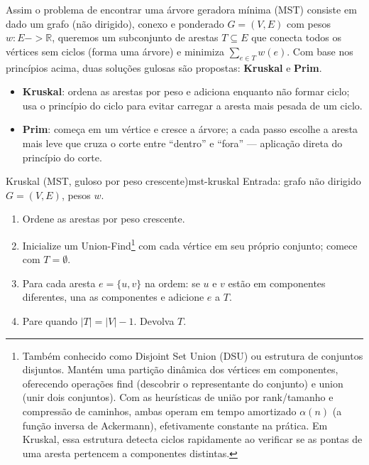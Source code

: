 \documentclass[12pt,a4paper]{article}
\def\texttt#1{#1}%
\def\emph#1{#1}%
\def\to{->}%
\begin{document}
Assim o problema de encontrar uma árvore geradora mínima (MST) consiste em dado um grafo (não dirigido), conexo e ponderado \(G=(V,E)\) com pesos \(w:E\to\mathbb{R}\), queremos um subconjunto de arestas \(T\subseteq E\) que conecta todos os vértices sem ciclos (forma uma árvore) e minimiza \(\sum_{e\in T} w(e)\). 
Com base nos princípios acima, duas soluções gulosas são propostas: \textbf{Kruskal} e \textbf{Prim}.

\begin{itemize}\setlength{\itemsep}{2pt}
    \item \textbf{Kruskal}: ordena as arestas por peso e adiciona enquanto não formar ciclo; usa o princípio do ciclo para evitar carregar a aresta mais pesada de um ciclo.
    \item \textbf{Prim}: começa em um vértice e cresce a árvore; a cada passo escolhe a aresta mais leve que cruza o corte entre “dentro” e “fora” — aplicação direta do princípio do corte.
\end{itemize}


\begin{algobox}{Kruskal (MST, guloso por peso crescente)}{mst-kruskal}
Entrada: grafo não dirigido \(G=(V,E)\), pesos \(w\).
\begin{enumerate}\setlength{\itemsep}{2pt}
    \item Ordene as arestas por peso crescente.
    \item Inicialize um \emph{Union-Find}\footnote{Também conhecido como \emph{Disjoint Set Union} (DSU) ou \emph{estrutura de conjuntos disjuntos}. Mantém uma partição dinâmica dos vértices em componentes, oferecendo operações \texttt{find} (descobrir o representante do conjunto) e \texttt{union} (unir dois conjuntos). Com as heurísticas de \emph{união por rank/tamanho} e \emph{compressão de caminhos}, ambas operam em tempo amortizado \(\alpha(n)\) (a função inversa de Ackermann), efetivamente constante na prática. Em Kruskal, essa estrutura detecta ciclos rapidamente ao verificar se as pontas de uma aresta pertencem a componentes distintas.} com cada vértice em seu próprio conjunto; comece com \(T=\emptyset\).
    \item Para cada aresta \(e=\{u,v\}\) na ordem: se \(u\) e \(v\) estão em componentes diferentes, una as componentes e adicione \(e\) a \(T\).
    \item Pare quando \(|T|=|V|-1\). Devolva \(T\).
\end{enumerate}
\end{algobox}
\end{document}
